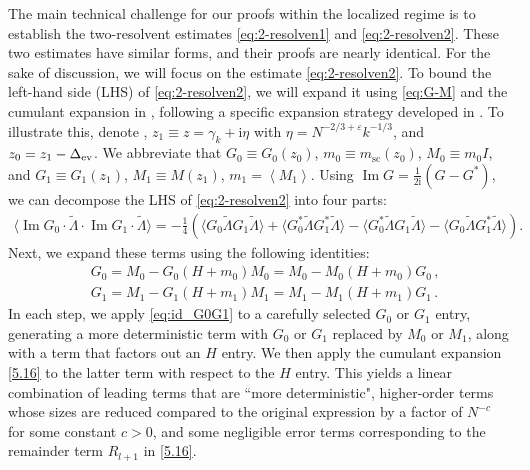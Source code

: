\documentclass[10pt,reqno]{amsart}
\numberwithin{equation}{section}
\numberwithin{figure}{section}
\theoremstyle{plain} %
\theoremstyle{definition} %
\newcommand{\wt}{\widetilde}
\renewcommand{\txt}[1]{\text{\rm{#1}}}
\newcommand{\E}{\mathbb{E}}
\newcommand{\ii}{\mathrm{i}}
\newcommand{\pa}[1]{\left({#1}\right)}
\newcommand{\avg}[1]{\langle #1 \rangle}
\newcommand{\avga}[1]{\left\langle #1 \right\rangle}
\DeclareMathOperator{\im}{\mathrm{Im}}
\newcommand{\tLambda}{{\wt{\Lambda}}}
\newcommand{\be}{\begin{equation}}
\newcommand{\ee}{\end{equation}}
\numberwithin{equation}{section}
\begin{document}
The main technical challenge for our proofs within the localized regime is to establish the two-resolvent estimates \eqref{eq:2-resolven1} and \eqref{eq:2-resolven2}. These two estimates have similar forms, and their proofs are nearly identical. For the sake of discussion, we will focus on the estimate \eqref{eq:2-resolven2}.  
To bound the left-hand side (LHS) of \eqref{eq:2-resolven2}, we will expand it using \eqref{eq:G-M} and the cumulant expansion in , following a specific  expansion strategy developed in \cite{stone2024randommatrixmodelquantum}.  %
To illustrate this, denote \smash{$\wt \Lambda=\Lambda-\Delta_\txt{ev}$}, $z_1 \equiv z =\gamma_k +\ii \eta
$ with $\eta=N^{-2/3+\varepsilon}k^{-1/3}$, and $z_0=z_1-\Delta_{\txt{ev}}$. We abbreviate that $G_0\equiv G_0\pa{z_0}$, $m_0\equiv m_{\mathrm{sc}}(z_0)$, $M_0\equiv m_0 I$, and $G_1\equiv G_1(z_1)$, $M_1\equiv M(z_1)$, $m_1=\avga{M_1}$. 
Using $\im G=\frac{1}{2\ii}\pa{G-G^*}$, we can decompose the LHS of \eqref{eq:2-resolven2} into four parts:
\begin{equation}\label{imaginary_part_4_fold_linearization}
    \begin{aligned}
\avg{\im G_0\cdot\tLambda\cdot\im G_1\cdot\tLambda}=-\frac 14 \left(\avg{G_0\tLambda G_1\tLambda}+\avg{G_0^*\tLambda G_1^*\tLambda}-\avg{G_0^*\tLambda G_1\tLambda}-\avg{G_0\tLambda G_1^*\tLambda}\right).
    \end{aligned}
\end{equation}
Next, we expand these terms using the following identities:
\be\label{eq:id_G0G1}
\begin{aligned}
&G_0=M_0-G_0\pa{H+m_{0}}M_0=M_0-M_0\pa{H+m_{0}}G_0 \, ,\\ 
&G_1=M_1-G_1\pa{H+m_1}M_1=M_1-M_1\pa{H+m_1}G_1 \, .    
\end{aligned}
\ee
In each step, we apply \eqref{eq:id_G0G1} to a carefully selected $G_0$ or $G_1$ entry, generating a more deterministic term with $G_0$ or $G_1$ replaced by $M_0$ or $M_1$, along with a term that factors out an $H$ entry. We then apply the cumulant expansion \eqref{5.16} to the latter term with respect to the $H$ entry. 
This yields a linear combination of leading terms that are ``more deterministic", higher-order terms whose sizes are reduced compared to the original expression by a factor of $N^{-c}$ for some constant $c>0$, and some negligible error terms corresponding to the remainder term $R_{l+1}$ in \eqref{5.16}. %
\end{document}
